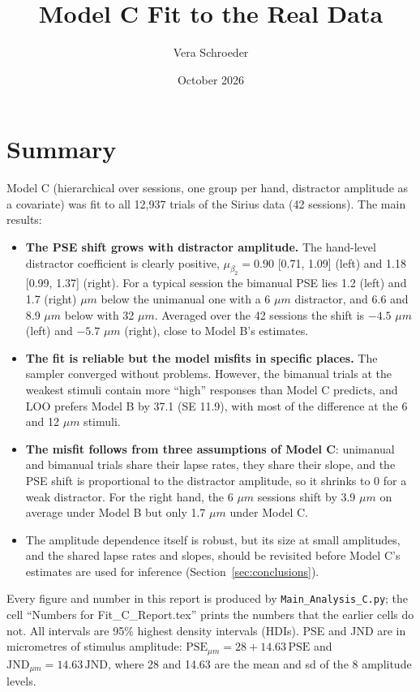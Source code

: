 \documentclass[11pt]{article}
\title{Model C Fit to the Real Data}
\author{Vera Schroeder}
\date{October 2026}
\newcommand{\code}[1]{\texttt{#1}}
\begin{document}
\maketitle

\section{Summary}

Model C (hierarchical over sessions, one group per hand, distractor amplitude as a
covariate) was fit to all 12{,}937 trials of the Sirius data (42 sessions). The main
results:

\begin{itemize}
  \item \textbf{The PSE shift grows with distractor amplitude.} The hand-level
        distractor coefficient is clearly positive, $\mu_{\beta_2} = 0.90$
        [0.71, 1.09] (left) and 1.18 [0.99, 1.37] (right). For a typical session
        the bimanual PSE lies 1.2 (left) and 1.7 (right) $\mu m$ below the unimanual
        one with a 6 $\mu m$ distractor, and 6.6 and 8.9 $\mu m$ below with 32
        $\mu m$. Averaged over the 42 sessions the shift is $-4.5$ $\mu m$ (left) and
        $-5.7$ $\mu m$ (right), close to Model B's estimates.
  \item \textbf{The fit is reliable but the model misfits in specific places.} The
        sampler converged without problems. However, the bimanual trials at the
        weakest stimuli contain more ``high'' responses than Model C predicts, and
        LOO prefers Model B by 37.1 (SE 11.9), with most of the difference at the
        6 and 12 $\mu m$ stimuli.
  \item \textbf{The misfit follows from three assumptions of Model C}: unimanual and
        bimanual trials share their lapse rates, they share their slope, and the
        PSE shift is proportional to the distractor amplitude, so it shrinks to 0
        for a weak distractor. For the right hand, the 6 $\mu m$ sessions shift by
        3.9 $\mu m$ on average under Model B but only 1.7 $\mu m$ under Model C.
  \item The amplitude dependence itself is robust, but its size at small amplitudes,
        and the shared lapse rates and slopes, should be revisited before Model C's
        estimates are used for inference (Section~\ref{sec:conclusions}).
\end{itemize}

Every figure and number in this report is produced by \code{Main\_Analysis\_C.py};
the cell ``Numbers for Fit\_C\_Report.tex'' prints the numbers that the earlier
cells do not. All intervals are 95\% highest density intervals (HDIs). PSE and JND
are in micrometres of stimulus amplitude: $\text{PSE}_{\mu m} = 28 + 14.63\,\text{PSE}$
and $\text{JND}_{\mu m} = 14.63\,\text{JND}$, where 28 and 14.63 are the mean and sd of
the 8 amplitude levels.
\end{document}
